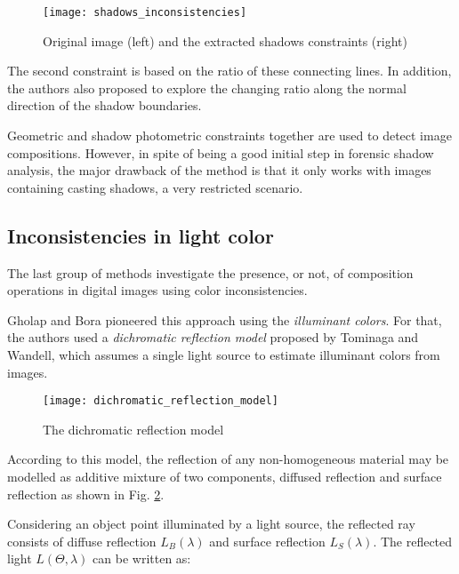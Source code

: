 \begin{figure}
  \centering
    \texttt{[image: shadows\_inconsistencies]}
    \caption{Original image (left) and the extracted shadows constraints (right)}
    \label{shadows_inconsistencies}
\end{figure}

The second constraint is based on the ratio of these connecting lines. In addition, the authors also proposed to explore the changing ratio along the normal direction of the shadow boundaries. 

Geometric and shadow photometric constraints together are used to detect image compositions. However, in spite of being a good initial step in forensic shadow analysis, the major drawback of the method is that it only works with images containing casting shadows, a very restricted scenario.

\subsection{Inconsistencies in light color}

The last group of methods investigate the presence, or not, of composition operations in digital images using color inconsistencies.

Gholap and Bora\cite{gholap2008illuminant}\cite{francis2014illuminant} pioneered this approach using the \emph{illuminant colors}. For that, the authors used a \emph{dichromatic reflection model} proposed by Tominaga and Wandell\cite{tominaga1989standard}, which assumes a single light source to estimate illuminant colors from images.

\begin{figure}
  \begin{center}
    \texttt{[image: dichromatic\_reflection\_model]}
  \end{center}
  \caption{The dichromatic reflection model}
    \label{fig:dichromaticreflectionmodel}
\end{figure}


According to this model, the reflection of any non-homogeneous material may be modelled as additive mixture of two components, diffused reflection and surface reflection as shown in Fig. \ref{fig:dichromaticreflectionmodel}.

Considering an object point illuminated by a light source, the reflected ray consists of diffuse reflection $L_B (\lambda)$ and surface reflection $L_S (\lambda)$. The reflected light $L(\Theta, \lambda)$ can be written as:

